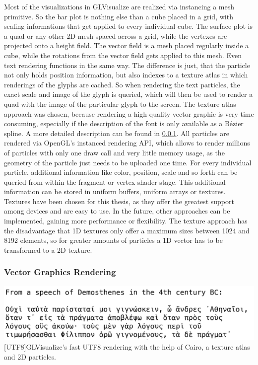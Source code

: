 Most of the visualizations in GLVisualize are realized via instancing a mesh primitive.
So the bar plot is nothing else than a cube placed in a grid, with scaling informations that get applied to every individual cube. The surface plot is a quad or any other 2D mesh spaced across a grid, while the vertexes are projected onto a height field. The vector field is a mesh placed regularly inside a cube, while the rotations from the vector field gets applied to this mesh. 
Even text rendering functions in the same way. The difference is just, that the particle not only holds position information, but also indexes to a texture atlas in which renderings of the glyphs are cached. So when rendering the text particles, the exact scale and image of the glyph is queried, which will then be used to render a quad with the image of the particular glyph to the screen.
The texture atlas approach was chosen, because rendering a high quality vector graphic is very time consuming, especially if the description of the font is only available as a Bézier spline. A more detailed description can be found in \ref{vector rendering}.
All particles are rendered via OpenGL's instanced rendering API, which allows to render millions of particles with only one draw call and very little memory usage, as the geometry of the particle just needs to be uploaded one time.
For every individual particle, additional information like color, position, scale and so forth can be queried from within the fragment or vertex shader stage.
This additional information can be stored in uniform buffers, uniform arrays or textures. Textures have been chosen for this thesis, as they offer the greatest support among devices and are easy to use. In the future, other approaches can be implemented, gaining more performance or flexibility.
The texture approach has the disadvantage that 1D textures only offer a maximum sizes between 1024 and 8192 elements, so for greater amounts of particles a 1D vector has to be transformed to a 2D texture.


\subsubsection{Vector Graphics Rendering}\label{vector rendering}
\vspace{1em}
\begin{minipage}{\linewidth}
    \centering
    \includegraphics[width=0.9\linewidth]{graphics/utf8.png}
    [UTF8]{GLVisualize's fast UTF8 rendering with the help of Cairo, a texture atlas and 2D particles.}
    \label{fig:UTF8}
\end{minipage}

